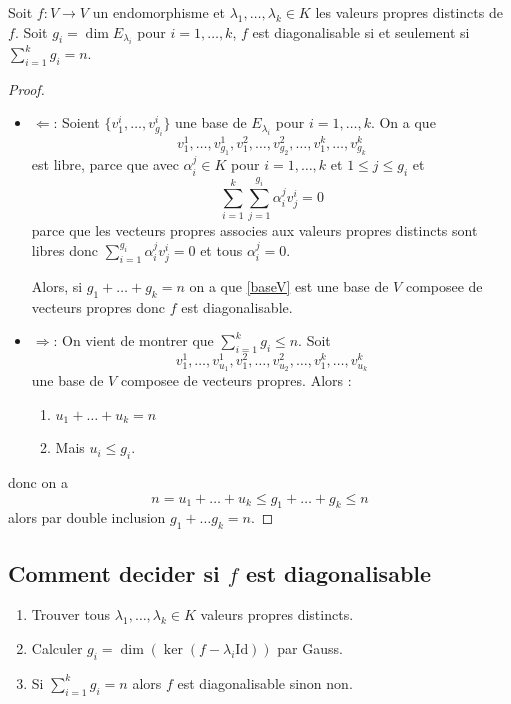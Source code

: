 \begin{theorem} \label{thmhier}
Soit $f:V\to V$ un endomorphisme et $\lambda_{1},\dots,\lambda _{k}\in K$ les valeurs propres distincts de $f$. Soit $g_{i}=\dim E_{\lambda _{i}}$ pour $i=1,\dots ,k$, $f$ est diagonalisable si et seulement si $\sum_{i=1}^{k}g_{i}=n$.
\end{theorem}
\begin{proof}
\begin{itemize}
\item $\Leftarrow$: Soient $\{ v_{1}^{i},\dots,v_{g_{i}}^{i} \}$ une base de $E_{\lambda _{i}}$ pour $i=1,\dots,k$. On a que
\begin{equation}
v_{1}^{1},\dots,v_{g_{1}}^{1},v_{1}^{2},\dots,v_{g_{2}}^{2},\dots,v_{1}^{k},\dots,v_{g_{k}}^{k} \label{baseV}
\end{equation}
est libre, parce que avec $\alpha _{i}^{j}\in K$ pour $i=1,\dots,k$  et $1\le j \le g_{i}$ et 
$$
\sum_{i=1}^{k} \sum_{j=1}^{g_{i}} \alpha _{i}^{j}v_{j}^{i}=0
$$
parce que les vecteurs propres associes aux valeurs propres distincts sont libres donc $\sum_{i=1}^{g_{i}}\alpha _{i}^{j}v_{j}^{i}=0$ et tous $\alpha _{i}^{j}=0$.

Alors, si $g_{1}+\dots +g_{k}=n$ on a que \ref{baseV} est une base de $V$ composee de vecteurs propres donc $f$ est diagonalisable.
\item $\Rightarrow$: On vient de montrer que $\sum _{i=1}^{k} g_{i}\le n$. Soit
$$
v_{1}^{1},\dots,v_{u_{1}}^{1},v_{1}^{2},\dots,v_{u_{2}}^{2},\dots,v_{1}^{k},\dots,v_{u_{k}}^{k}
$$
une base de $V$ composee de vecteurs propres. Alors :
\begin{enumerate}
\item $u_{1}+\dots+u_{k}=n$
\item Mais $u_{i}\le g_{i}$.
\end{enumerate}
\end{itemize}
donc on a 
$$
n=u_{1}+\dots+u_{k}\le g_{1}+\dots +g_{k}\le n
$$
alors par double inclusion $g_{1}+\dots g_{k}=n$.
\end{proof}


\subsection*{Comment decider si \texorpdfstring{$f$}{f} est diagonalisable}

\begin{enumerate}
\item Trouver tous $\lambda_{1},\dots,\lambda _{k}\in K$ valeurs propres distincts.
\item Calculer $g_{i}=\dim(\ker(f-\lambda _{i}\mathrm{Id}))$ par Gauss.
\item Si $\sum_{i=1}^{k}g_{i}=n$ alors $f$ est diagonalisable sinon non.
\end{enumerate}
